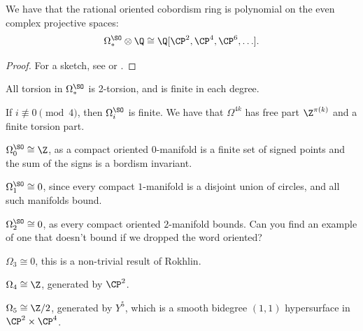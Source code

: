 \documentclass[11pt]{book}
\begin{document}
\begin{theorem}[Thom]
\label{thm:Q-algebra-generators-rational-omega-SO} 
We have that the rational oriented cobordism ring is polynomial on the even complex projective spaces:
\begin{align*}
    \Omega_\ast^\SO \otimes\Q \cong \Q[\CP^2,\CP^4,\CP^6, \ldots].
\end{align*}
\end{theorem}
\begin{proof} For a sketch, see \cite[Lecture~12]{Freed-bordism} or \cite[\S16]{MilnorStasheff}.
\end{proof}

\begin{theorem} All torsion in $\Omega^{\SO}_\ast$ is 2-torsion, and is finite in each degree.
\end{theorem}

\begin{theorem} If $i\not\equiv 0\pmod{4}$, then $\Omega^\SO_i$ is finite. We have that $\Omega^{4k}$ has free part $\Z^{\pi(k)}$ and a finite torsion part.
\end{theorem}

\begin{example} $\Omega^\SO_0\cong \Z$, as a compact oriented $0$-manifold is a finite set of signed points and the sum of the signs is a bordism invariant.
\end{example}

\begin{example} $\Omega^\SO_1\cong 0$, since every compact $1$-manifold is a disjoint union of circles, and all such manifolds bound. 
\end{example}

\begin{example} $\Omega^\SO_2\cong 0$, as every compact oriented $2$-manifold bounds. Can you find an example of one that doesn't bound if we dropped the word oriented?
\end{example}

\begin{example} $\Omega_3\cong 0$, this is a non-trivial result of Rokhlin.
\end{example}

\begin{example} $\Omega_4\cong \Z$, generated by $\CP^2$.
\end{example}

\begin{example} $\Omega_5 \cong \Z/2$, generated by $Y^5$, which is a smooth bidegree $(1,1)$ hypersurface in $\CP^2 \times \CP^4$.
\end{example}
\end{document}
